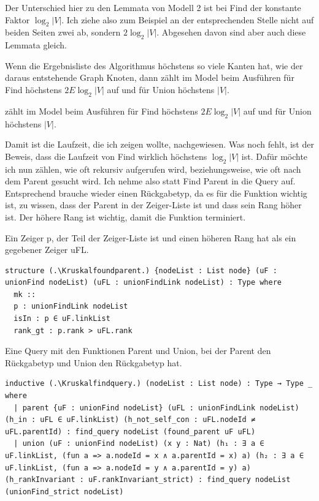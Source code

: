 Der Unterschied hier zu den Lemmata von Modell 2 ist bei Find der konstante Faktor $\log_2|V|$.
Ich ziehe also zum Beispiel an der entsprechenden Stelle nicht auf beiden Seiten zwei ab, sondern $2\log_2|V|$.
Abgesehen davon sind aber auch diese Lemmata gleich.

\begin{lemma}[\Kruskalkruskalhelpertimethree]
  Wenn die Ergebnisliste des Algorithmus höchstens so viele Kanten hat, wie der daraus entstehende Graph Knoten, 
  dann zählt \Kruskalkruskalhelperprogstrict im Model \Kruskalkruskalmodelthree beim Ausführen für Find höchstens $2E\log_2|V|$ auf und für Union höchstens $|V|$.
\end{lemma}
\begin{lemma}[\Kruskalkruskaltimethree]
  \Kruskalkruskalprogstrict zählt im Model \Kruskalkruskalmodelthree beim Ausführen für Find höchstens $2E\log_2|V|$ auf und für Union höchstens $|V|$.
\end{lemma}

Damit ist die Laufzeit, die ich zeigen wollte, nachgewiesen.
Was noch fehlt, ist der Beweis, dass die Laufzeit von Find wirklich höchstens $\log_2|V|$ ist.
Dafür möchte ich nun zählen, wie oft \KruskalconnectedcomponentofunionFindofunionFindLink rekursiv aufgerufen wird, beziehungsweise, wie oft nach dem Parent gesucht wird.
Ich nehme also statt Find Parent in die Query auf.
Entsprechend brauche wieder einen Rückgabetyp, da es für die Funktion wichtig ist, zu wissen, dass der Parent in der Zeiger-Liste ist und dass sein Rang höher ist.
Der höhere Rang ist wichtig, damit die Funktion terminiert.

\begin{definition}[\Kruskalfoundparent]
  Ein Zeiger p, der Teil der Zeiger-Liste ist und einen höheren Rang hat als ein gegebener Zeiger uFL.
\end{definition}
\begin{lstlisting}
structure (.\Kruskalfoundparent.) {nodeList : List node} (uF : unionFind nodeList) (uFL : unionFindLink nodeList) : Type where
  mk ::
  p : unionFindLink nodeList
  isIn : p ∈ uF.linkList
  rank_gt : p.rank > uFL.rank
\end{lstlisting}

\begin{definition}[\Kruskalfindquery]
  Eine Query mit den Funktionen Parent und Union, bei der Parent den Rückgabetyp \Kruskalfoundparent und Union den Rückgabetyp \KruskalunionFindstrict hat.
\end{definition}
\begin{lstlisting}
inductive (.\Kruskalfindquery.) (nodeList : List node) : Type → Type _ where
  | parent {uF : unionFind nodeList} (uFL : unionFindLink nodeList) (h_in : uFL ∈ uF.linkList) (h_not_self_con : uFL.nodeId ≠ uFL.parentId) : find_query nodeList (found_parent uF uFL)
  | union (uF : unionFind nodeList) (x y : Nat) (h₁ : ∃ a ∈ uF.linkList, (fun a => a.nodeId = x ∧ a.parentId = x) a) (h₂ : ∃ a ∈ uF.linkList, (fun a => a.nodeId = y ∧ a.parentId = y) a) (h_rankInvariant : uF.rankInvariant_strict) : find_query nodeList (unionFind_strict nodeList)
\end{lstlisting}

